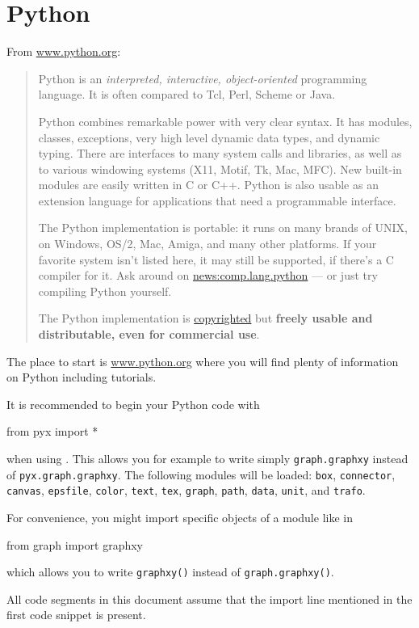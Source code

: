 \documentclass[11pt,DIV14]{scrartcl}
\begin{document}
\section{Python}

{}
{\label{q:what_is_python}
From \url{www.python.org}:
\begin{quote}
Python is an \textit{interpreted, interactive, object-oriented} programming 
language. It is often compared to Tcl, Perl, Scheme or Java.

Python combines remarkable power with very clear syntax. It has modules, 
classes, exceptions, very high level dynamic data types, and dynamic typing. 
There are interfaces to many system calls and libraries, as well as to various 
windowing systems (X11, Motif, Tk, Mac, MFC). New built-in modules are easily 
written in C or C++. Python is also usable as an extension language for 
applications that need a programmable interface.

The Python implementation is portable: it runs on many brands of UNIX, on 
Windows, OS/2, Mac, Amiga, and many other platforms. If your favorite system 
isn't listed here, it may still be supported, if there's a C compiler for it. 
Ask around on \href{news:comp.lang.python}{news:comp.lang.python} --- or just 
try compiling Python yourself.

The Python implementation is 
\href{http://www.python.org/doc/Copyright.html}{copyrighted} 
but \textbf{freely usable and distributable, even for commercial use}.
\end{quote}
}

{}
{The place to start is \url{www.python.org} where you will find plenty of
information on Python including tutorials.
}

{}
{It is recommended to begin your Python code with 
\begin{progcode}
from pyx import *
\end{progcode}
when using \PyX. This allows you for example to write simply 
\texttt{graph.graphxy}
instead of \texttt{pyx.graph.graphxy}. The following modules will be loaded:
\texttt{box}, \texttt{connector}, \texttt{canvas}, \texttt{epsfile},
\texttt{color}, \texttt{text}, \texttt{tex}, \texttt{graph}, \texttt{path},
\texttt{data}, \texttt{unit}, and \texttt{trafo}.

For convenience, you might import specific objects of a module like in
\begin{progcode}
from graph import graphxy
\end{progcode}
which allows you to write \texttt{graphxy()} instead of \texttt{graph.graphxy()}.

All code segments in this document assume that the import line mentioned in
the first code snippet is present.
}
\end{document}
